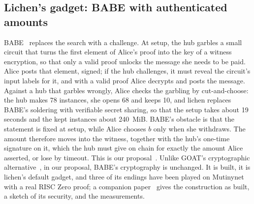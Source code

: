 \documentclass[11pt]{article}
\begin{document}
\subsection{Lichen's gadget: BABE with authenticated amounts}

BABE~\cite{babe} replaces the search with a challenge. At setup, the hub
garbles a small circuit that turns the first element of Alice's proof
into the key of a witness encryption, so that only a valid proof unlocks
the message she needs to be paid. Alice posts that element, signed; if
the hub challenges, it must reveal the circuit's input labels for it,
and with a valid proof Alice decrypts and posts the message. Against a
hub that garbles wrongly, Alice checks the garbling by cut-and-choose: the
hub makes 78 instances, she opens 68 and keeps 10, and lichen replaces
BABE's soldering with verifiable secret sharing, so that the setup takes
about 19 seconds and the kept instances about 240~MiB. BABE's obstacle is
that the statement is fixed at setup, while Alice chooses $b$ only when
she withdraws. The amount therefore moves into the witness, together with
the hub's one-time signature on it, which the hub must give on chain for
exactly the amount Alice asserted, or lose by timeout. This is our
proposal~\cite{delving}. Unlike GOAT's cryptographic
alternative~\cite{goat}, in our proposal, BABE's cryptography is
unchanged. It is built, it is lichen's default gadget, and three of its
endings have been played on Mutinynet with a real RISC Zero proof; a
companion paper~\cite{lichenbabe} gives the construction as built, a
sketch of its security, and the measurements.
\end{document}
